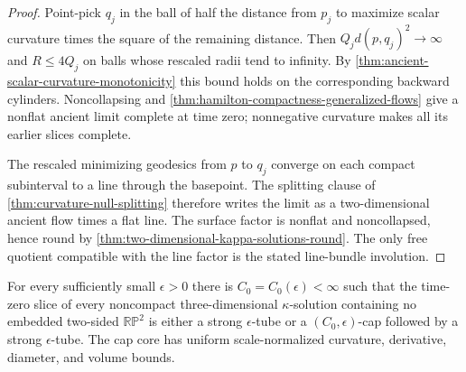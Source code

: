 \begin{proof}
Point-pick $q_j$ in the ball of half the distance from $p_j$ to maximize
scalar curvature times the square of the remaining distance.  Then
$Q_jd(p,q_j)^2\to\infty$ and $R\le4Q_j$ on balls whose rescaled radii tend
to infinity.  By \ref{thm:ancient-scalar-curvature-monotonicity} this bound
holds on the corresponding backward cylinders.  Noncollapsing and
\ref{thm:hamilton-compactness-generalized-flows} give a nonflat ancient limit
complete at time zero; nonnegative curvature makes all its earlier slices
complete.

The rescaled minimizing geodesics from $p$ to $q_j$ converge on each compact
subinterval to a line through the basepoint.  The splitting clause of
\ref{thm:curvature-null-splitting} therefore writes the limit as a
two-dimensional ancient flow times a flat line.  The surface factor is
nonflat and noncollapsed, hence round by
\ref{thm:two-dimensional-kappa-solutions-round}.  The only free quotient
compatible with the line factor is the stated line-bundle involution.
\end{proof}

\begin{theorem}
\label{thm:noncompact-kappa-solution-structure}
\notready
For every sufficiently small $\epsilon>0$ there is
$C_0=C_0(\epsilon)<\infty$ such that the time-zero slice of every
noncompact three-dimensional $\kappa$-solution containing no embedded
two-sided $\mathbb{RP}^2$ is either a strong $\epsilon$-tube or a
$(C_0,\epsilon)$-cap followed by a strong $\epsilon$-tube.  The cap core has
uniform scale-normalized curvature, derivative, diameter, and volume bounds.
\end{theorem}

